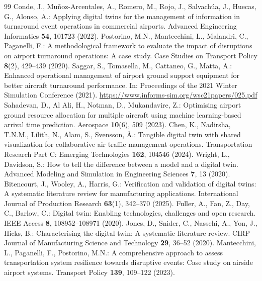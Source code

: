 \documentclass[runningheads]{llncs}
\begin{document}
\begin{thebibliography}{99}
 Conde, J., Mu\~noz-Arcentales, A., Romero, M., Rojo, J., Salvach\'ua, J., Huecas, G., Alonso, A.: Applying digital twins for the management of information in turnaround event operations in commercial airports. Advanced Engineering Informatics \textbf{54}, 101723 (2022). 
 Postorino, M.N., Mantecchini, L., Malandri, C., Paganelli, F.: A methodological framework to evaluate the impact of disruptions on airport turnaround operations: A case study. Case Studies on Transport Policy \textbf{8}(2), 429--439 (2020). 
 Saggar, S., Tomasella, M., Cattaneo, G., Matta, A.: Enhanced operational management of airport ground support equipment for better aircraft turnaround performance. In: Proceedings of the 2021 Winter Simulation Conference (2021). \url{https://www.informs-sim.org/wsc21papers/025.pdf}
 Sahadevan, D., Al Ali, H., Notman, D., Mukandavire, Z.: Optimising airport ground resource allocation for multiple aircraft using machine learning-based arrival time prediction. Aerospace \textbf{10}(6), 509 (2023). 
 Chen, K., Nadirsha, T.N.M., Lilith, N., Alam, S., Svensson, \AA.: Tangible digital twin with shared visualization for collaborative air traffic management operations. Transportation Research Part C: Emerging Technologies \textbf{162}, 104546 (2024). 
 Wright, L., Davidson, S.: How to tell the difference between a model and a digital twin. Advanced Modeling and Simulation in Engineering Sciences \textbf{7}, 13 (2020). 
 Bitencourt, J., Wooley, A., Harris, G.: Verification and validation of digital twins: A systematic literature review for manufacturing applications. International Journal of Production Research \textbf{63}(1), 342--370 (2025). 
 Fuller, A., Fan, Z., Day, C., Barlow, C.: Digital twin: Enabling technologies, challenges and open research. IEEE Access \textbf{8}, 108952--108971 (2020). 
 Jones, D., Snider, C., Nassehi, A., Yon, J., Hicks, B.: Characterising the digital twin: A systematic literature review. CIRP Journal of Manufacturing Science and Technology \textbf{29}, 36--52 (2020). 
 Mantecchini, L., Paganelli, F., Postorino, M.N.: A comprehensive approach to assess transportation system resilience towards disruptive events: Case study on airside airport systems. Transport Policy \textbf{139}, 109--122 (2023). 

\end{thebibliography}
\end{document}
